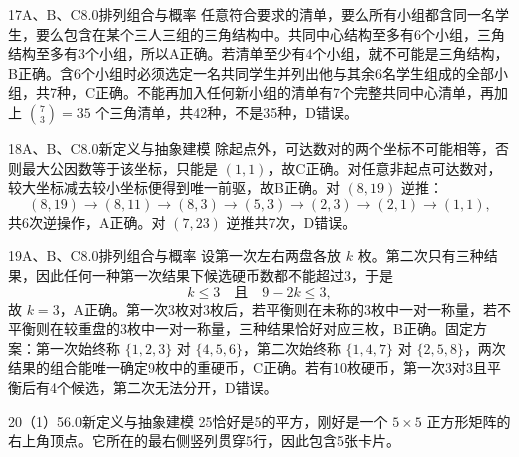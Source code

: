 \begin{solution}{17}{A、B、C}{8.0}{排列组合与概率}
任意符合要求的清单，要么所有小组都含同一名学生，要么包含在某个三人三组的三角结构中。共同中心结构至多有6个小组，三角结构至多有3个小组，所以A正确。若清单至少有4个小组，就不可能是三角结构，B正确。含6个小组时必须选定一名共同学生并列出他与其余6名学生组成的全部小组，共7种，C正确。不能再加入任何新小组的清单有7个完整共同中心清单，再加上 \(\binom73=35\) 个三角清单，共42种，不是35种，D错误。
\end{solution}

\begin{solution}{18}{A、B、C}{8.0}{新定义与抽象建模}
除起点外，可达数对的两个坐标不可能相等，否则最大公因数等于该坐标，只能是 \((1,1)\)，故C正确。对任意非起点可达数对，较大坐标减去较小坐标便得到唯一前驱，故B正确。对 \((8,19)\) 逆推：
\[
  (8,19)\to(8,11)\to(8,3)\to(5,3)\to(2,3)\to(2,1)\to(1,1),
\]
共6次逆操作，A正确。对 \((7,23)\) 逆推共7次，D错误。
\end{solution}

\begin{solution}{19}{A、B、C}{8.0}{排列组合与概率}
设第一次左右两盘各放 \(k\) 枚。第二次只有三种结果，因此任何一种第一次结果下候选硬币数都不能超过3，于是
\[
  k\le3\quad\text{且}\quad 9-2k\le3,
\]
故 \(k=3\)，A正确。第一次3枚对3枚后，若平衡则在未称的3枚中一对一称量，若不平衡则在较重盘的3枚中一对一称量，三种结果恰好对应三枚，B正确。固定方案：第一次始终称 \(\{1,2,3\}\) 对 \(\{4,5,6\}\)，第二次始终称 \(\{1,4,7\}\) 对 \(\{2,5,8\}\)，两次结果的组合能唯一确定9枚中的重硬币，C正确。若有10枚硬币，第一次3对3且平衡后有4个候选，第二次无法分开，D错误。
\end{solution}


\begin{solution}{20（1）}{5}{6.0}{新定义与抽象建模}
25恰好是5的平方，刚好是一个 \(5\times5\) 正方形矩阵的右上角顶点。它所在的最右侧竖列贯穿5行，因此包含5张卡片。
\end{solution}

